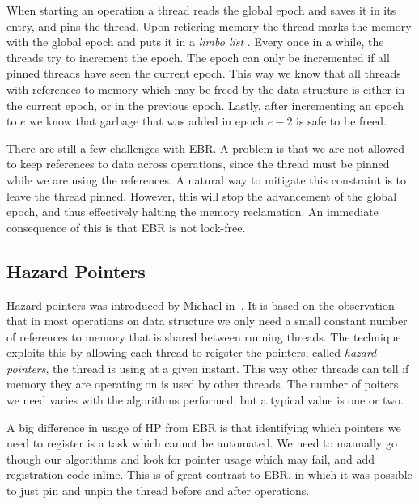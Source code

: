 \documentclass[a4paper,twoside]{article}
\begin{document}
When starting an operation a thread reads the global epoch and saves it
in its entry, and pins the thread.
Upon retiering memory the thread marks the memory with the global epoch
and puts it in a \emph{limbo list} .
Every once in a while, the threads try to increment the epoch.
The epoch can only be incremented if all pinned threads
have seen the current epoch. This way we know that all threads
with references to memory which may be freed by the data structure
is either in the current epoch, or in the previous epoch.
Lastly, after incrementing an epoch to $e$ we know that garbage that
was added in epoch $e-2$ is safe to be freed.


There are still a few challenges with EBR.
A problem is that we are not allowed to keep references to data across operations,
since the thread must be pinned while we are using the references.
A natural way to mitigate this constraint is to leave the thread pinned.
However, this will stop the advancement of the global epoch, and thus effectively
halting the memory reclamation.
An immediate consequence of this is that EBR is not lock-free.



\subsection{Hazard Pointers}

Hazard pointers was introduced by Michael in~\cite{michael2004hazard}.
It is based on the observation that in most operations on data structure
we only need a small constant number of references to memory that is shared
between running threads. The technique exploits this by allowing each
thread to reigster the pointers, called \emph{hazard pointers},
the thread is using at a given instant. This way other threads can tell
if memory they are operating on is used by other threads.
The number of poiters we need varies with the algorithms performed,
but a typical value is one or two.

A big difference in usage of HP from EBR is that identifying which
pointers we need to register is a task which cannot be automated.
We need to manually go though our algorithms and look for pointer
usage which may fail, and add registration code inline.
This is of great contrast to EBR, in which it was possible to
just pin and unpin the thread before and after operations.
\end{document}
